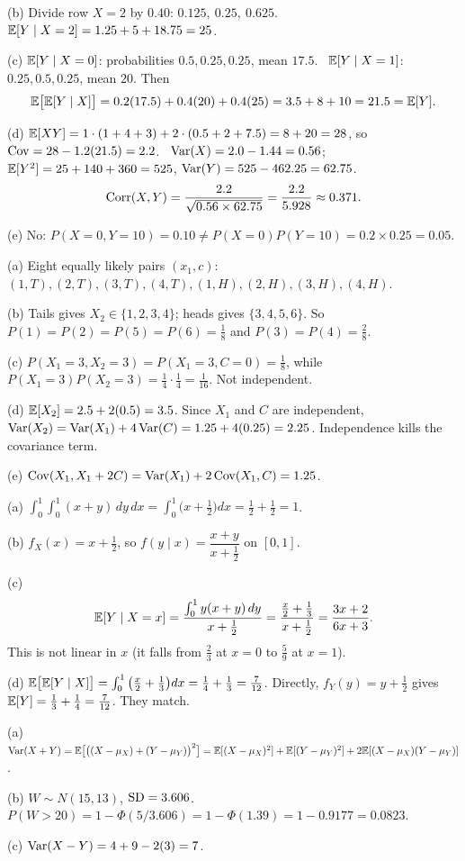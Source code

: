 \documentclass[11pt]{article}
\begin{document}
(b) Divide row $X=2$ by $0.40$: $0.125,\ 0.25,\ 0.625$. \ $\mathbb{E}[Y\mid X=2]=1.25+5+18.75=25$.

(c) $\mathbb{E}[Y\mid X=0]$: probabilities $0.5,0.25,0.25$, mean $17.5$. \ $\mathbb{E}[Y\mid X=1]$: $0.25,0.5,0.25$, mean $20$. Then
\[ \mathbb{E}\big[\mathbb{E}[Y\mid X]\big]=0.2(17.5)+0.4(20)+0.4(25)=3.5+8+10=21.5=\mathbb{E}[Y]. \]

(d) $\mathbb{E}[XY]=1\cdot(1+4+3)+2\cdot(0.5+2+7.5)=8+20=28$, so $\operatorname{Cov}=28-1.2(21.5)=2.2$. \ $\operatorname{Var}(X)=2.0-1.44=0.56$; \ $\mathbb{E}[Y^2]=25+140+360=525$, $\operatorname{Var}(Y)=525-462.25=62.75$.
\[ \operatorname{Corr}(X,Y)=\frac{2.2}{\sqrt{0.56\times62.75}}=\frac{2.2}{5.928}\approx0.371. \]

(e) No: $P(X=0,Y=10)=0.10\ne P(X=0)P(Y=10)=0.2\times0.25=0.05$.

(a) Eight equally likely pairs $(x_1,c)$: $(1,T),(2,T),(3,T),(4,T),(1,H),(2,H),(3,H),(4,H)$.

(b) Tails gives $X_2\in\{1,2,3,4\}$; heads gives $\{3,4,5,6\}$. So $P(1)=P(2)=P(5)=P(6)=\tfrac18$ and $P(3)=P(4)=\tfrac28$.

(c) $P(X_1=3,X_2=3)=P(X_1=3,C=0)=\tfrac18$, while $P(X_1=3)P(X_2=3)=\tfrac14\cdot\tfrac14=\tfrac1{16}$. Not independent.

(d) $\mathbb{E}[X_2]=2.5+2(0.5)=3.5$. Since $X_1$ and $C$ are independent, $\operatorname{Var}(X_2)=\operatorname{Var}(X_1)+4\operatorname{Var}(C)=1.25+4(0.25)=2.25$. Independence kills the covariance term.

(e) $\operatorname{Cov}(X_1,X_1+2C)=\operatorname{Var}(X_1)+2\operatorname{Cov}(X_1,C)=1.25$.

(a) $\int_0^1\!\int_0^1(x+y)\,dy\,dx=\int_0^1\big(x+\tfrac12\big)dx=\tfrac12+\tfrac12=1$.

(b) $f_X(x)=x+\tfrac12$, so $f(y\mid x)=\dfrac{x+y}{x+\tfrac12}$ on $[0,1]$.

(c)
\[ \mathbb{E}[Y\mid X=x]=\frac{\int_0^1 y(x+y)\,dy}{x+\frac12}=\frac{\frac x2+\frac13}{x+\frac12}=\frac{3x+2}{6x+3}. \]
This is not linear in $x$ (it falls from $\tfrac23$ at $x=0$ to $\tfrac59$ at $x=1$).

(d) $\mathbb{E}\big[\mathbb{E}[Y\mid X]\big]=\int_0^1\big(\tfrac x2+\tfrac13\big)dx=\tfrac14+\tfrac13=\tfrac7{12}$. Directly, $f_Y(y)=y+\tfrac12$ gives $\mathbb{E}[Y]=\tfrac13+\tfrac14=\tfrac7{12}$. They match.

(a) $\operatorname{Var}(X+Y)=\mathbb{E}\big[\big((X-\mu_X)+(Y-\mu_Y)\big)^2\big]=\mathbb{E}[(X-\mu_X)^2]+\mathbb{E}[(Y-\mu_Y)^2]+2\mathbb{E}[(X-\mu_X)(Y-\mu_Y)]$.

(b) $W\sim N(15,13)$, $\operatorname{SD}=3.606$. $P(W>20)=1-\Phi(5/3.606)=1-\Phi(1.39)=1-0.9177=0.0823$.

(c) $\operatorname{Var}(X-Y)=4+9-2(3)=7$.
\end{document}
